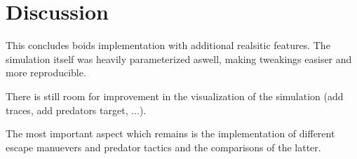 \documentclass[9pt]{pnas-new}
\begin{document}
\pagebreak

\section*{Discussion}

This concludes boids implementation with additional realsitic features.
The simulation itself was heavily parameterized aswell, making tweakings easiser and more reproducible.

There is still room for improvement in the visualization of the simulation (add traces, add predators target, ...).

The most important aspect which remains is the implementation of different escape manuevers and predator tactics and the comparisons of the latter.


\showacknow %


\begin{multicols}{2}
	\section*{\bibname}
	
\end{multicols}
\end{document}
